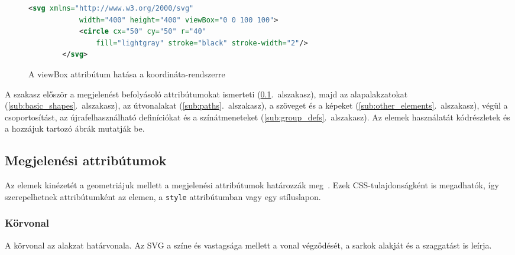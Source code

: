 \begin{figure}[H]
    \centering
    \begin{adjustbox}{valign=m, max width=0.7\textwidth}
        \begin{lstlisting}[language=XML]
        <svg xmlns="http://www.w3.org/2000/svg"
            width="400" height="400" viewBox="0 0 100 100">
            <circle cx="50" cy="50" r="40"
                fill="lightgray" stroke="black" stroke-width="2"/>
        </svg>
        \end{lstlisting}
    \end{adjustbox}
    \hfill
    \begin{adjustbox}{valign=m, max width=0.2\textwidth}
        
    \end{adjustbox}
    \caption{A viewBox attribútum hatása a koordináta-rendszerre}
    \label{fig:example_viewbox}
\end{figure}

A szakasz először a megjelenést befolyásoló attribútumokat ismerteti (\ref{sub:vis_attrs}.~alszakasz), majd az alapalakzatokat (\ref{sub:basic_shapes}.~alszakasz), az útvonalakat (\ref{sub:paths}.~alszakasz), a szöveget és a képeket (\ref{sub:other_elements}.~alszakasz), végül a csoportosítást, az újrafelhasználható definíciókat és a színátmeneteket (\ref{sub:group_defs}.~alszakasz). Az elemek használatát kódrészletek és a hozzájuk tartozó ábrák mutatják be.

\subsection{Megjelenési attribútumok}
\label{sub:vis_attrs}

Az elemek kinézetét a geometriájuk mellett a megjelenési attribútumok határozzák meg~\cite{mdn-svg-attributes,w3c-svg-painting}. Ezek CSS-tulajdonságként is megadhatók, így szerepelhetnek attribútumként az elemen, a \texttt{style} attribútumban vagy egy stíluslapon.

\subsubsection{Körvonal}

A körvonal az alakzat határvonala. Az SVG a színe és vastagsága mellett a vonal végződését, a sarkok alakját és a szaggatást is leírja.

